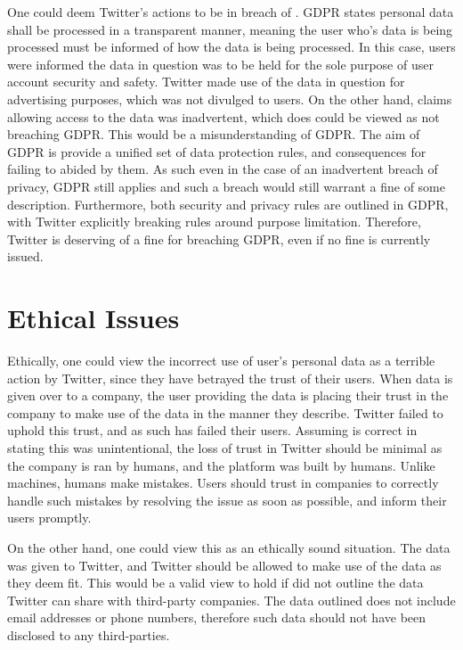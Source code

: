 \documentclass[a4paper, 11pt]{article}
\begin{document}
One could deem Twitter's actions to be in breach of \textcite{_regulation_2016}.
GDPR states personal data shall be processed in a transparent manner, meaning the user who's data is being processed must be informed of how the data is being processed.
In this case, users were informed the data in question was to be held for the sole purpose of user account security and safety.
Twitter made use of the data in question for advertising purposes, which was not divulged to users.
On the other hand, \textcite{support_personal_2019} claims allowing access to the data was inadvertent, which does could be viewed as not breaching GDPR.
This would be a misunderstanding of GDPR.
The aim of GDPR is provide a unified set of data protection rules, and consequences for failing to abided by them.
As such even in the case of an inadvertent breach of privacy, GDPR still applies and such a breach would still warrant a fine of some description.
Furthermore, both security and privacy rules are outlined in GDPR, with Twitter explicitly breaking rules around purpose limitation.
Therefore, Twitter is deserving of a fine for breaching GDPR, even if no fine is currently issued.

\section{Ethical Issues}
Ethically, one could view the incorrect use of user's personal data as a terrible action by Twitter, since they have betrayed the trust of their users.
When data is given over to a company, the user providing the data is placing their trust in the company to make use of the data in the manner they describe.
Twitter failed to uphold this trust, and as such has failed their users.
Assuming \textcite{support_twitter_2019} is correct in stating this was unintentional, the loss of trust in Twitter should be minimal as the company is ran by humans, and the platform was built by humans.
Unlike machines, humans make mistakes.
Users should trust in companies to correctly handle such mistakes by resolving the issue as soon as possible, and inform their users promptly.

On the other hand, one could view this as an ethically sound situation.
The data was given to Twitter, and Twitter should be allowed to make use of the data as they deem fit.
This would be a valid view to hold if \textcite{twitter_privacy_2018} did not outline the data Twitter can share with third-party companies.
The data outlined does not include email addresses or phone numbers, therefore such data should not have been disclosed to any third-parties.
\end{document}
